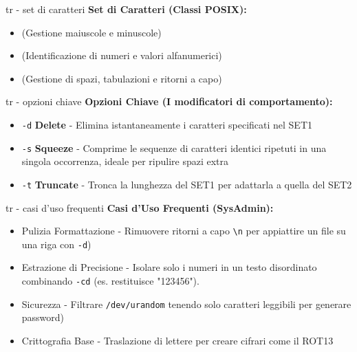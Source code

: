 \begin{frame}[fragile]{tr - set di caratteri}
	\textbf{Set di Caratteri (Classi POSIX):}
	\begin{itemize}
		\item \code{[:upper:] / [:lower:]} (Gestione maiuscole e minuscole)
		\item \code{[:digit:] / [:alnum:]} (Identificazione di numeri e valori alfanumerici)
		\item \code{[:space:]} (Gestione di spazi, tabulazioni e ritorni a capo)
	\end{itemize}
\end{frame}
\begin{frame}[fragile]{tr - opzioni chiave}
	\textbf{Opzioni Chiave (I modificatori di comportamento):}
	\begin{itemize}
		\item \texttt{-d} \textbf{Delete} - Elimina istantaneamente i caratteri specificati nel SET1
		\item \texttt{-s} \textbf{Squeeze} - Comprime le sequenze di caratteri identici ripetuti in una singola occorrenza, ideale per ripulire spazi extra
		\item \texttt{-t} \textbf{Truncate} - Tronca la lunghezza del SET1 per adattarla a quella del SET2
	\end{itemize}
\end{frame}
\begin{frame}[fragile]{tr - casi d'uso frequenti}
	\textbf{Casi d'Uso Frequenti (SysAdmin):}
	\begin{itemize}
		\item Pulizia Formattazione - Rimuovere ritorni a capo \verb|\n| per appiattire un file su una riga con \texttt{-d})
		\item Estrazione di Precisione - Isolare solo i numeri in un testo disordinato combinando \texttt{-cd}
		 (es.  restituisce "123456").
		\item Sicurezza - Filtrare \texttt{/dev/urandom} tenendo solo caratteri leggibili per generare password)
		\item Crittografia Base - Traslazione di lettere per creare cifrari come il ROT13
	\end{itemize}
\end{frame}
